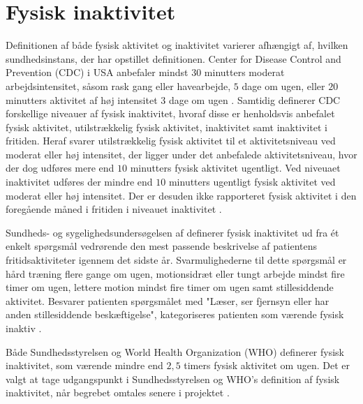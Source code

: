\section{Fysisk inaktivitet} \label{sec:fys_inaktivitet}

Definitionen af både fysisk aktivitet og inaktivitet varierer afhængigt af, hvilken sundhedsinstans, der har opstillet definitionen. Center for Disease Control and Prevention (CDC) i USA anbefaler mindst $30$ minutters moderat arbejdsintensitet, såsom rask gang eller havearbejde, $5$ dage om ugen, eller $20$ minutters aktivitet af høj intensitet $3$ dage om ugen \citep{motionsraad2007,christensen2012}.
Samtidig definerer CDC forskellige niveauer af fysisk inaktivitet, hvoraf disse er henholdsvis anbefalet fysisk aktivitet, utilstrækkelig fysisk aktivitet, inaktivitet samt inaktivitet i fritiden. Heraf svarer utilstrækkelig fysisk aktivitet til et aktivitetsniveau ved moderat eller høj intensitet, der ligger under det anbefalede aktivitetsniveau, hvor der dog udføres mere end $10$ minutters fysisk aktivitet ugentligt. Ved niveuaet inaktivitet udføres der mindre end $10$ minutters ugentligt fysisk aktivitet ved moderat eller høj intensitet. Der er desuden ikke rapporteret fysisk aktivitet i den foregående måned i fritiden i niveauet inaktivitet  \citep{motionsraad2007,christensen2012}.

Sundheds- og sygelighedsundersøgelsen af \citeauthor{christensen2012} definerer fysisk inaktivitet ud fra ét enkelt spørgsmål vedrørende den mest passende beskrivelse af patientens fritidsaktiviteter igennem det sidste år. Svarmulighederne til dette spørgsmål er hård træning flere gange om ugen, motionsidræt eller tungt arbejde mindst fire timer om ugen, lettere motion mindst fire timer om ugen samt stillesiddende aktivitet. Besvarer patienten spørgsmålet med "Læser, ser fjernsyn eller har anden stillesiddende beskæftigelse", kategoriseres patienten som værende fysisk inaktiv \citep{motionsraad2007,christensen2012}.

Både Sundhedsstyrelsen og World Health Organization (WHO) definerer fysisk inaktivitet, som værende mindre end $2,5$ timers fysisk aktivitet om ugen. Det er valgt at tage udgangspunkt i Sundhedsstyrelsen og WHO's definition af fysisk inaktivitet, når begrebet omtales senere i projektet \citep{motionsraad2007}.